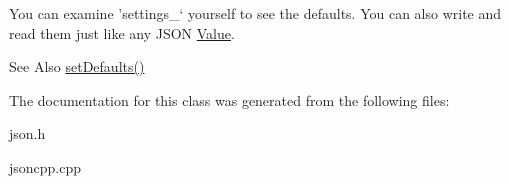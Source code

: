 You can examine 'settings\-\_\-` yourself to see the defaults. You can also write and read them just like any J\-S\-O\-N \hyperlink{class_json_1_1_value}{Value}. \begin{DoxySeeAlso}{See Also}
\hyperlink{class_json_1_1_stream_writer_builder_a53bf106b141e28637b01ad0ecd2acbf6}{set\-Defaults()} 
\end{DoxySeeAlso}


The documentation for this class was generated from the following files\-:\begin{DoxyCompactItemize}
\item 
json.\-h\item 
jsoncpp.\-cpp\end{DoxyCompactItemize}
